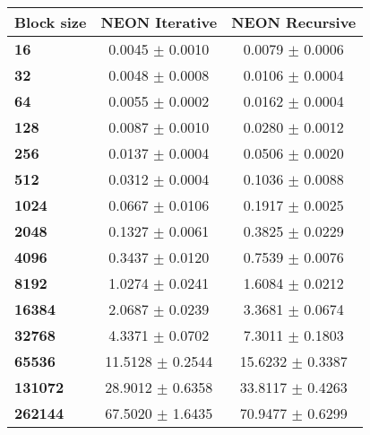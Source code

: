 \begin{tabular}{lcc}\toprule
\textbf{Block size}  & \textbf{NEON Iterative} & \textbf{NEON Recursive} \\\midrule
\textbf{16}  & 0.0045 $\pm$ 0.0010 & 0.0079 $\pm$ 0.0006 \\
\textbf{32}  & 0.0048 $\pm$ 0.0008 & 0.0106 $\pm$ 0.0004 \\
\textbf{64}  & 0.0055 $\pm$ 0.0002 & 0.0162 $\pm$ 0.0004 \\
\textbf{128}  & 0.0087 $\pm$ 0.0010 & 0.0280 $\pm$ 0.0012 \\
\textbf{256}  & 0.0137 $\pm$ 0.0004 & 0.0506 $\pm$ 0.0020 \\
\textbf{512}  & 0.0312 $\pm$ 0.0004 & 0.1036 $\pm$ 0.0088 \\
\textbf{1024}  & 0.0667 $\pm$ 0.0106 & 0.1917 $\pm$ 0.0025 \\
\textbf{2048}  & 0.1327 $\pm$ 0.0061 & 0.3825 $\pm$ 0.0229 \\
\textbf{4096}  & 0.3437 $\pm$ 0.0120 & 0.7539 $\pm$ 0.0076 \\
\textbf{8192}  & 1.0274 $\pm$ 0.0241 & 1.6084 $\pm$ 0.0212 \\
\textbf{16384}  & 2.0687 $\pm$ 0.0239 & 3.3681 $\pm$ 0.0674 \\
\textbf{32768}  & 4.3371 $\pm$ 0.0702 & 7.3011 $\pm$ 0.1803 \\
\textbf{65536}  & 11.5128 $\pm$ 0.2544 & 15.6232 $\pm$ 0.3387 \\
\textbf{131072}  & 28.9012 $\pm$ 0.6358 & 33.8117 $\pm$ 0.4263 \\
\textbf{262144} & 67.5020 $\pm$ 1.6435 & 70.9477 $\pm$ 0.6299 \\
\bottomrule
\end{tabular}
